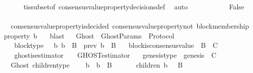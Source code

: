 \begin{isabellebody}
\ \ \ \ \isamarkupfalse%
\ {\isasymSigma}t{\isacharunderscore}is{\isacharunderscore}subset{\isacharunderscore}of{\isacharunderscore}{\isasymSigma}\ consensus{\isacharunderscore}value{\isacharunderscore}property{\isacharunderscore}decisions{\isacharunderscore}def\ \isamarkupfalse%
\ auto\ \ \ \ \ \ \isanewline
\ \ \isamarkupfalse%
\ \isamarkupfalse%
\ False\isanewline
\ \ \ \ \ \isamarkupfalse%
\ {\isacartoucheopen}{\isasymnot}\ consensus{\isacharunderscore}value{\isacharunderscore}property{\isacharunderscore}is{\isacharunderscore}decided\ {\isacharparenleft}consensus{\isacharunderscore}value{\isacharunderscore}property{\isacharunderscore}not\ {\isacharparenleft}block{\isacharunderscore}membership{\isacharunderscore}property\ b{}{\isacharparenright}{\isacharcomma}\ {\isasymsigma}{}{\isacharparenright}{\isacartoucheclose}\ \isamarkupfalse%
\ blast\isanewline
\ \isamarkupfalse%
%
\endisatagproof
{\isafoldproof}%
%
\isadelimproof
\isanewline
%
\endisadelimproof
\isanewline
\isanewline
\isanewline
{}\isamarkupfalse%
\ Ghost\ {\isacharequal}\ GhostParams\ {\isacharplus}\ Protocol\ {\isacharplus}\isanewline
\ \ \ block{\isacharunderscore}type\ {\isacharcolon}\ {\isachardoublequoteopen}{\isasymforall}\ b{\isachardot}\ b\ {\isasymin}\ B\ {\isasymlongleftrightarrow}\ prev\ b\ {\isasymin}\ B{\isachardoublequoteclose}\isanewline
\ \ \ block{\isacharunderscore}is{\isacharunderscore}consensus{\isacharunderscore}value\ {\isacharcolon}\ {\isachardoublequoteopen}B\ {\isacharequal}\ C{\isachardoublequoteclose}\isanewline
\ \ \ ghost{\isacharunderscore}is{\isacharunderscore}estimator\ {\isacharcolon}\ {\isachardoublequoteopen}{\isasymepsilon}\ {\isacharequal}\ GHOST{\isacharunderscore}estimator{\isachardoublequoteclose}\isanewline
\ \ \ genesis{\isacharunderscore}type\ {\isacharcolon}\ {\isachardoublequoteopen}genesis\ {\isasymin}\ C{\isachardoublequoteclose}\isanewline
\isanewline
{}\isamarkupfalse%
\ {\isacharparenleft}\ Ghost{\isacharparenright}\ children{\isacharunderscore}type\ {\isacharcolon}\isanewline
\ \ {\isachardoublequoteopen}{\isasymforall}\ b\ {\isasymsigma}{\isachardot}\ b\ {\isasymin}\ B\ {\isasymand}\ {\isasymsigma}\ {\isasymin}\ {\isasymSigma}\ {\isasymlongrightarrow}\ \ children\ {\isacharparenleft}b{\isacharcomma}\ {\isasymsigma}{\isacharparenright}\ {\isasymsubseteq}\ B{\isachardoublequoteclose}\isanewline

\end{isabellebody}
